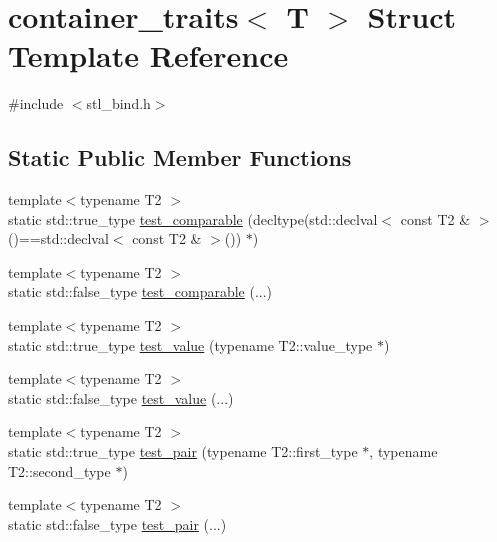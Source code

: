 \hypertarget{structcontainer__traits}{}\section{container\+\_\+traits$<$ T $>$ Struct Template Reference}
\label{structcontainer__traits}


{\ttfamily \#include $<$stl\+\_\+bind.\+h$>$}

\subsection*{Static Public Member Functions}
\begin{DoxyCompactItemize}
\item 
{\footnotesize template$<$typename T2 $>$ }\\static std\+::true\+\_\+type \mbox{\hyperlink{structcontainer__traits_a0a60178e5fff65d3a89a1454776e1668}{test\+\_\+comparable}} (decltype(std\+::declval$<$ const T2 \& $>$()==std\+::declval$<$ const T2 \& $>$()) $\ast$)
\item 
{\footnotesize template$<$typename T2 $>$ }\\static std\+::false\+\_\+type \mbox{\hyperlink{structcontainer__traits_ac2cd8fecd9029ec8e2a4d14b04223d6d}{test\+\_\+comparable}} (...)
\item 
{\footnotesize template$<$typename T2 $>$ }\\static std\+::true\+\_\+type \mbox{\hyperlink{structcontainer__traits_a00e1d17df72634112a0d82724df08e97}{test\+\_\+value}} (typename T2\+::value\+\_\+type $\ast$)
\item 
{\footnotesize template$<$typename T2 $>$ }\\static std\+::false\+\_\+type \mbox{\hyperlink{structcontainer__traits_a8ed5be321721d91c3d68ef269b848988}{test\+\_\+value}} (...)
\item 
{\footnotesize template$<$typename T2 $>$ }\\static std\+::true\+\_\+type \mbox{\hyperlink{structcontainer__traits_a29ea1a081953a79394605cc9ca7a3694}{test\+\_\+pair}} (typename T2\+::first\+\_\+type $\ast$, typename T2\+::second\+\_\+type $\ast$)
\item 
{\footnotesize template$<$typename T2 $>$ }\\static std\+::false\+\_\+type \mbox{\hyperlink{structcontainer__traits_afbc50d3448c347e73f94cfe1a8d1b2b8}{test\+\_\+pair}} (...)
\end{DoxyCompactItemize}
